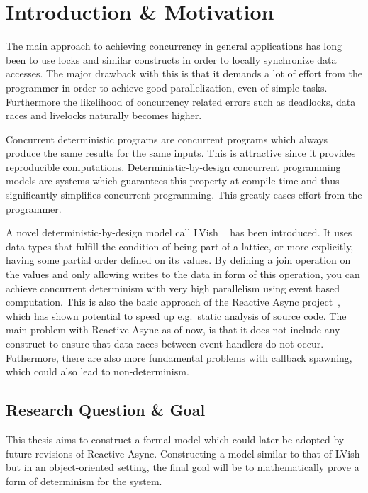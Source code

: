 \chapter{Introduction \& Motivation}
\label{cha:introduction}

The main approach to achieving concurrency in general applications has long been
to use locks and similar constructs in order to locally synchronize data
accesses. The major drawback with this is that it demands a lot of effort from
the programmer in order to achieve good parallelization, even of simple tasks.
Furthermore the likelihood of concurrency related errors such as deadlocks, data
races and livelocks naturally becomes higher. 

Concurrent deterministic programs are concurrent programs which always produce
the same results for the same inputs. This is attractive since it provides
reproducible computations.  Deterministic-by-design concurrent programming
models are systems which guarantees this property at compile time and thus
significantly simplifies concurrent programming. This greatly eases effort
from the programmer. 

A novel deterministic-by-design model call LVish ~\parencite{kuper2013lvars,
kuper2014freeze} has been introduced.  It uses data types that fulfill the
condition of being part of a lattice, or more explicitly, having some partial
order defined on its values. By defining a join operation on the values and only
allowing writes to the data in form of this operation, you can achieve concurrent
determinism with very high parallelism using event based computation.  This is
also the basic approach of the Reactive Async
project~\parencite{conf/scala/HallerGES16}, which has shown potential to speed up
e.g.\ static analysis of source code. The main problem with Reactive Async as
of now, is that it does not include any construct to ensure that data races
between event handlers do not occur. Futhermore, there are also more fundamental
problems with callback spawning, which could also lead to non-determinism.

\section{Research Question \& Goal}%
\label{sec:goal}


This thesis aims to construct a formal model which could later be adopted by
future revisions of Reactive Async. Constructing a model similar to that
of LVish but in an object-oriented setting, the final goal
will be to mathematically prove a form of determinism for the system.

